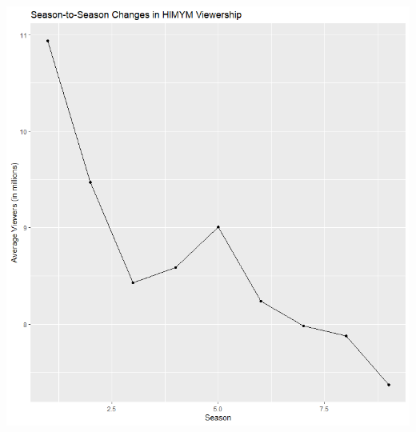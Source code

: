 \documentclass[
  letterpaper,
  DIV=11,
  numbers=noendperiod]{scrartcl}
\begin{document}
\includegraphics{Rplot01.png}
\end{document}
